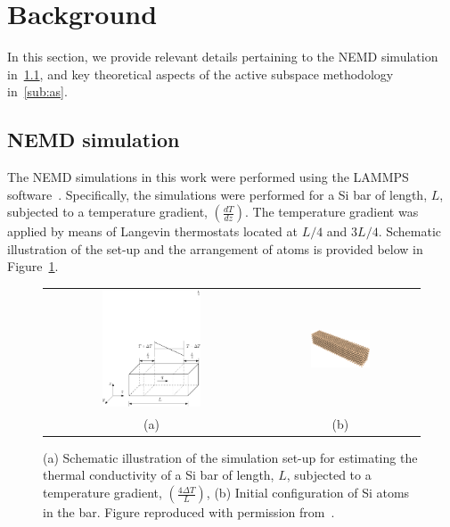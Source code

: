 \section{Background}
\label{sec:bg}

In this section, we provide relevant details pertaining to the NEMD simulation 
in~\ref{sub:nemd}, and key theoretical aspects of the active subspace methodology 
in~\ref{sub:as}.

\subsection{NEMD simulation}
\label{sub:nemd}

The NEMD simulations in this work were performed using the LAMMPS software~\cite{Plimpton:2007}.
Specifically, the simulations were performed for a Si bar of length, $L$, subjected to a temperature gradient, 
$\left(\frac{dT}{dz}\right)$. The temperature gradient was applied by means of Langevin thermostats located
at $L/4$ and $3L/4$. Schematic illustration of the set-up and the arrangement of atoms is provided below in 
Figure~\ref{fig:setup}.
%
\begin{figure}[htbp]
\begin{center}
\begin{tabular}{cc}
  \includegraphics[width=0.48\textwidth]{./Figures/schematic}
  &
  \hspace{3mm}
  \includegraphics[width=0.40\textwidth]{./Figures/Sibar_05}
  \\ (a) & (b)
  \end{tabular}
\caption{(a) Schematic illustration of the simulation set-up for estimating the thermal conductivity of a Si bar of
length, $L$, subjected to a temperature gradient, $\left(\frac{4\Delta T}{L}\right)$, (b) 
Initial configuration of Si atoms in the bar. Figure reproduced with permission 
from~\cite{Vohra:2018a}.}
\label{fig:setup}
\end{center}
\end{figure}

